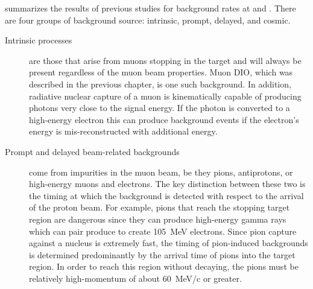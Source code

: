  summarizes the results of previous studies for background rates at \phaseI and \phaseII.
There are four groups of background source: intrinsic, prompt, delayed, and cosmic.
\begin{description}
\item [Intrinsic processes]
                    are those that arise from muons stopping in the target and will always be present regardless of the muon beam properties.
Muon \ac{DIO}, which was described in the previous chapter, is one such background.
In addition, radiative nuclear capture of a muon is kinematically capable of producing photons very close to the signal energy.
If the photon is converted to a high-energy electron this can produce background events if the electron's energy is mis-reconstructed with additional energy.


\item [Prompt and delayed beam-related backgrounds]
                             come from impurities in the muon beam, be they pions, antiprotons, or high-energy muons and electrons.
The key distinction between these two is the timing at which the background is detected with respect to the arrival of the proton beam.
For example, pions that reach the stopping target region are dangerous since they can produce high-energy gamma rays which can pair produce to create 105~MeV electrons.
Since pion capture against a nucleus is extremely fast, the timing of pion-induced backgrounds is determined predominantly by the arrival time of pions into the target region.
In order to reach this region without decaying, the pions must be relatively high-momentum of about 60~MeV/c or greater.  


\end{description}
